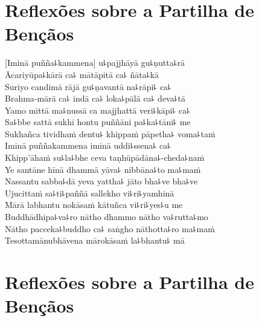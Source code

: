 \chapter*[Partilha de Bençãos]{Reflexões sobre a Partilha de Bençãos}

\delegateSetUseNext

\begin{leader}
\end{leader}


[Iminā puñña꜕kammena] u꜕pajjhāyā gu꜕ṇutta꜕rā\\
Ācariyūpa꜕kārā ca꜕ mātāpitā ca꜕ ñāta꜕kā\\
Suriyo candimā rājā gu꜕ṇavantā na꜕rāpi꜕ ca꜕\\
Brahma-mārā ca꜕ indā ca꜕ loka꜕pālā ca꜕ deva꜕tā\\
Yamo mittā ma꜕nussā ca majjhattā veri꜕kāpi꜕ ca꜕\\
Sa꜕bbe sattā sukhī hontu puññāni pa꜕ka꜕tāni꜕ me\\
Sukhañca tividhaṁ dentu꜕ khippaṁ pāpetha꜕ voma꜕taṁ\\
Iminā puññakammena iminā uddi꜕ssena꜕ ca꜕\\
Khipp'āhaṁ su꜕la꜕bhe ceva taṇhūpādāna꜕-cheda꜕naṁ\\
Ye santāne hīnā dhammā yāva꜕ nibbāna꜕to ma꜕maṁ\\
Nassantu sabba꜕dā yeva yattha꜕ jāto bha꜕ve bha꜕ve\\
Ujucittaṁ sa꜕ti꜕paññā sallekho vi꜕ri꜕yamhinā\\
Mārā labhantu nokāsaṁ kātuñca vi꜕ri꜕yes꜕u me\\
Buddhādhipa꜕va꜕ro nātho dhammo nātho va꜕rutta꜕mo\\
Nātho pacceka꜕buddho ca꜕ saṅgho nāthotta꜕ro ma꜕maṁ\\
Tesottamānubhāvena mārokāsaṁ la꜕bhantu꜕ mā

\chapter[Partilha de Bençãos]{Reflexões sobre a Partilha de Bençãos}

\enlargethispage{2\baselineskip}

\begin{leader}
\end{leader}



